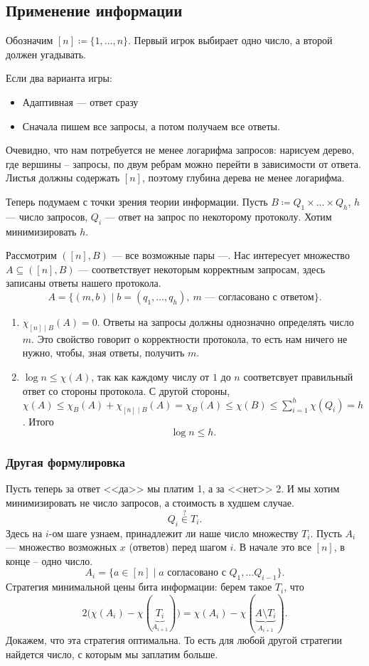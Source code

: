 \subsection{Применение информации}
Обозначим $ [n] \coloneqq \{1, \ldots , n\}$.
Первый игрок выбирает одно число, а второй должен угадывать.

Если два варианта игры:
\begin{itemize}
	\item Адаптивная --- ответ сразу
	\item Сначала пишем все запросы, а потом получаем все ответы.
\end{itemize}
Очевидно, что нам потребуется не менее логарифма запросов: нарисуем дерево, где вершины -- запросы, по двум ребрам можно перейти в зависимости от ответа. Листья должны содержать $ [n]$, поэтому глубина дерева не менее логарифма.
\begin{figure}[ht]
    \centering
    \label{fig:graph-img}
\end{figure}

Теперь подумаем с точки зрения теории информации. Пусть $ B \coloneqq Q_1 \times \ldots \times Q_h$, $ h$ --- число запросов, $ Q_i$ --- ответ на запрос по некоторому протоколу.
Хотим минимизировать $ h$.

Рассмотрим $ ([n], B)$ --- все возможные пары ---. Нас интересует множество  $ A \subseteq ([n], B)$ --- соответствует некоторым корректным запросам, здесь записаны ответы нашего протокола.
\[
	A = \{(m, b) \mid b = (q_1, \ldots , q_h), ~ m \text{ --- согласовано с ответом}\}
.\] 

\begin{enumerate}
	\item $ \chi _{[n] \mid B}(A) = 0$. Ответы на запросы должны однозначно определять число $ m$. Это свойство говорит о корректности протокола, то есть нам ничего не нужно, чтобы, зная ответы, получить $ m$.
	\item $ \log n \le \chi(A)$, так как каждому числу от $1$ до $n$ соответсвует правильный ответ со стороны протокола. С другой стороны, $ \chi(A) \le \chi_{B}(A) + \chi_{[n] \mid B}(A) = \chi_B(A) \le \chi\left( B \right) \le \sum_{i=1}^{h} \chi(Q_i) = h $. 
		Итого
		\[
		\log n \le  h
		.\] 
\end{enumerate} 

\subsubsection{Другая формулировка}
Пусть теперь за ответ <<да>> мы платим 1, а за <<нет>> 2. И мы хотим минимизировать не число запросов, а стоимость в худшем случае.
 \[
Q_i \stackrel{?}{\in} T_i
.\] 
Здесь на $i$-ом шаге узнаем, принадлежит ли наше число множеству $T_i$. Пусть $ A_i$ --- множество возможных $ x$ (ответов) перед шагом $ i$. В начале это все $ [n]$, в конце -- одно число.
\[
	A_i = \{a \in [n] \mid a \text{ согласовано с } Q_1, \ldots Q_{i-1}\}
.\] 
Стратегия минимальной цены бита информации: берем такое $ T_i$, что
 \[
	 2\bigl(\chi(A_i) - \chi(\underbrace{T_i}_{A_{i+1}})\bigr) = \chi(A_i) - \chi(\underbrace{A \setminus T_i}_{A_{i+1}})
.\] 
Докажем, что эта стратегия оптимальна. То есть для любой другой стратегии найдется число, с которым мы заплатим больше.

